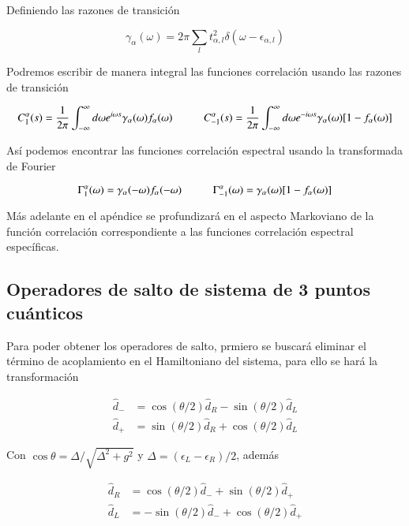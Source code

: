 \begin{appendixs}
Definiendo las razones de transición

\begin{equation*}
    \gamma_{\alpha}(\omega) = 2\pi \sum_{l}t^{2}_{\alpha,l}\delta(\omega-\epsilon_{\alpha,l})
\end{equation*}

Podremos escribir de manera integral las funciones correlación usando las razones de transición

\begin{equation*}
    C_{1}^{\alpha}(s) = \frac{1}{2\pi} \int_{-\infty}^{\infty}d\omega e^{i\omega s} \gamma_{\alpha}(\omega) f_{\alpha}(\omega)  \hspace{10mm} C_{-1}^{\alpha}(s) = \frac{1}{2\pi} \int_{-\infty}^{\infty}d\omega e^{-i\omega s} \gamma_{\alpha}(\omega) [1-f_{\alpha}(\omega)]
\end{equation*}

Así podemos encontrar las funciones correlación espectral usando la transformada de Fourier

\begin{equation*}
    \Gamma_{1}^{\alpha}(\omega) = \gamma_{\alpha}(-\omega)f_{\alpha}(-\omega)  \hspace{10mm} \Gamma_{-1}^{\alpha}(\omega) = \gamma_{\alpha}(\omega)[1-f_{\alpha}(\omega)]
\end{equation*}

Más adelante en el apéndice se profundizará en el aspecto Markoviano de la función correlación correspondiente a las funciones correlación espectral específicas.
\label{apendix5bathcorre}

\subsection{ Operadores de salto de sistema de 3 puntos cuánticos}
Para poder obtener los operadores de salto, prmiero se buscará eliminar el término de acoplamiento en el Hamiltoniano del sistema, para ello se hará la transformación

\begin{align*}
    \hat{d}_{-} & = \cos(\theta/2)\hat{d}_{R} - \sin(\theta/2)\hat{d}_{L} \\
    \hat{d}_{+} & = \sin(\theta/2)\hat{d}_{R} + \cos(\theta/2)\hat{d}_{L}
\end{align*}


Con $\cos \theta = \Delta/\sqrt{ \Delta^{2} + g^{2} }$ y $\Delta = (\epsilon_{L} - \epsilon_{R})/2$, además  

\begin{align*}
    \hat{d}_{R} & = \cos(\theta/2)\hat{d}_{-} + \sin(\theta/2)\hat{d}_{+} \\
    \hat{d}_{L} & = -\sin(\theta/2)\hat{d}_{-} + \cos(\theta/2)\hat{d}_{+}
\end{align*}


\end{appendixs}
